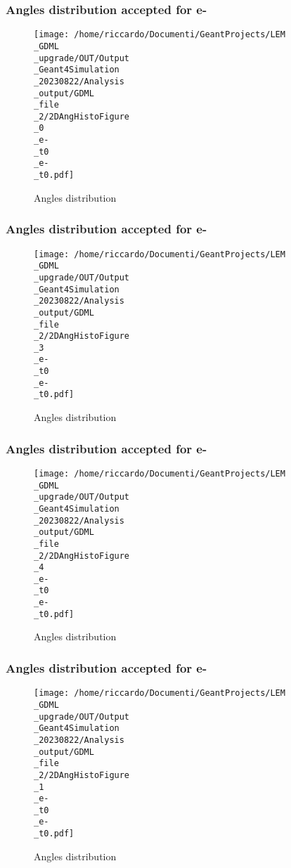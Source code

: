 \documentclass[8pt]{beamer}
\begin{document}
            \begin{frame}
                \frametitle{Angles distribution accepted for e-}
            
        \begin{figure}[h]
            \centering
            \texttt{[image: /home/riccardo/Documenti/GeantProjects/LEM\\\_GDML\\\_upgrade/OUT/Output\\\_Geant4Simulation\\\_20230822/Analysis\\\_output/GDML\\\_file\\\_2/2DAngHistoFigure\\\_0\\\_e-\\\_t0\\\_e-\\\_t0.pdf]}
            \caption{Angles distribution}
        \end{figure}
        
            \end{frame}
            
            \begin{frame}
                \frametitle{Angles distribution accepted for e-}
            
        \begin{figure}[h]
            \centering
            \texttt{[image: /home/riccardo/Documenti/GeantProjects/LEM\\\_GDML\\\_upgrade/OUT/Output\\\_Geant4Simulation\\\_20230822/Analysis\\\_output/GDML\\\_file\\\_2/2DAngHistoFigure\\\_3\\\_e-\\\_t0\\\_e-\\\_t0.pdf]}
            \caption{Angles distribution}
        \end{figure}
        
            \end{frame}
            
            \begin{frame}
                \frametitle{Angles distribution accepted for e-}
            
        \begin{figure}[h]
            \centering
            \texttt{[image: /home/riccardo/Documenti/GeantProjects/LEM\\\_GDML\\\_upgrade/OUT/Output\\\_Geant4Simulation\\\_20230822/Analysis\\\_output/GDML\\\_file\\\_2/2DAngHistoFigure\\\_4\\\_e-\\\_t0\\\_e-\\\_t0.pdf]}
            \caption{Angles distribution}
        \end{figure}
        
            \end{frame}
            
            \begin{frame}
                \frametitle{Angles distribution accepted for e-}
            
        \begin{figure}[h]
            \centering
            \texttt{[image: /home/riccardo/Documenti/GeantProjects/LEM\\\_GDML\\\_upgrade/OUT/Output\\\_Geant4Simulation\\\_20230822/Analysis\\\_output/GDML\\\_file\\\_2/2DAngHistoFigure\\\_1\\\_e-\\\_t0\\\_e-\\\_t0.pdf]}
            \caption{Angles distribution}
        \end{figure}
        
            \end{frame}
            
\end{document}
